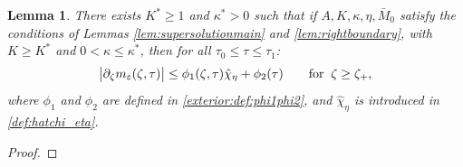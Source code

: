 \documentclass[11pt]{aims}
\newtheorem{lemma}[theorem]{Lemma}
\theoremstyle{definition}
\newcommand{\ep}{\varepsilon}
\newcommand{\pa}{\partial}
\numberwithin{equation}{section}
\begin{document}
\begin{lemma} \label{lemm:mep_mid} There exists $K^*\geq 1$ and $\kappa^*>0$ such that if $A,K,\kappa,\eta,\bar M_0$ satisfy the conditions of Lemmas \ref{lem:supersolutionmain} and \ref{lem:rightboundary}, with $K\geq K^*$ and $0<\kappa\leq \kappa^*$, then for all $\tau_0\leq \tau \leq \tau_1$:
\begin{equation}\label{est:mep_mid}
\big|\pa_\zeta m_\ep (\zeta, \tau)\big| \leq \phi_1(\zeta, \tau)  \hat \chi_{\eta}+  \phi_2(\tau) \qquad  \textup{for}\;\; \zeta \geq \zeta_+,
\end{equation}
where $\phi_1$ and $\phi_2$ are defined in \eqref{exterior:def:phi1phi2}, and $\hat \chi_{\eta}$ is introduced in \eqref{def:hatchi_eta}. 
\end{lemma}
\begin{proof}


\end{proof}
\end{document}
